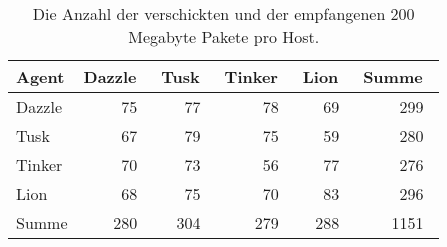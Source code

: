 \begin{table}
\centering
\begin{tabular}{l%
 r<{\,}%
 r<{\,}%
 r<{\,}%
 r<{\,}%
 r<{\,}%
}
Agent  				& Dazzle	& Tusk		& Tinker	& Lion		& Summe		\\
\hline
Dazzle 				& 75		& 77		& 78		& 69		& 299		\\
Tusk 				& 67		& 79		& 75		& 59		& 280		\\
Tinker				& 70		& 73		& 56		& 77		& 276		\\
Lion				& 68		& 75		& 70		& 83		& 296		\\ 
Summe				& 280		& 304		& 279 		& 288		& 1151		\\
\end{tabular}
\caption{Die Anzahl der verschickten und der empfangenen 200 Megabyte Pakete pro Host.}
\label{tab:VerschicktePakete200Mb}
\end{table}



